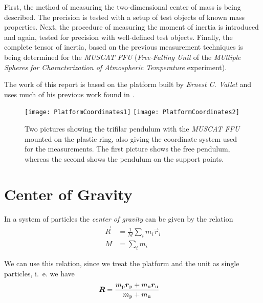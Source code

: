 \documentclass[journal]{IEEEtran}
\begin{document}
First, the method of measuring the two-dimensional center of mass is being described. The precision is tested with a setup of test objects of known mass properties.
Next, the procedure of measuring the moment of inertia is introduced and again, tested for precision with well-defined test objects.
Finally, the complete tensor of inertia, based on the previous measurement techniques is being determined for the \emph{MUSCAT FFU} (\emph{Free-Falling Unit} of the \emph{MUltiple Spheres for Characterization of Atmospheric Temperature} experiment).

The work of this report is based on the platform built by \emph{Ernest C. Vallet} and uses much of his previous work found in \cite{report:ernest}.

% 
% 
% 
% 

\begin{figure*}
	\centering
	\texttt{[image: PlatformCoordinates1]}
	\texttt{[image: PlatformCoordinates2]}
	\caption{Two pictures showing the trifilar pendulum with the \emph{MUSCAT FFU} mounted on the plastic ring, also giving the coordinate system used for the measurements. The first picture shows the free pendulum, whereas the second shows the pendulum on the support points.}
	\label{fig:Platform}
\end{figure*}

\section{Center of Gravity}

In a system of particles the \emph{center of gravity} can be given by the relation \cite{book:goldstein}
\begin{align}
	\vec{R} & = \frac{1}{M} \sum_{i} m_i \vec{r}_i \\
	\label{eq:SystemCoG}
	M & = \sum_{i} m_i
\end{align}

We can use this relation, since we treat the platform and the unit as single particles, i.~e. we have
\begin{align}
	\vec{R} & = \frac{m_{\textup{p}} \vec{r}_{\textup{p}} + m_{\textup{u}} \vec{r}_{\textup{u}}}{m_{\textup{p}} + m_{\textup{u}}} \label{eq:CogFull}
\end{align}
\end{document}

